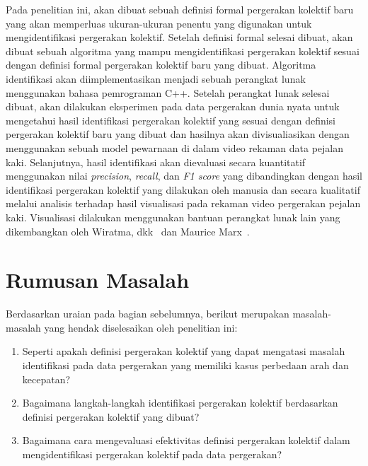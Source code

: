 Pada penelitian ini, akan dibuat sebuah definisi formal pergerakan kolektif baru yang akan memperluas ukuran-ukuran penentu yang digunakan untuk mengidentifikasi pergerakan kolektif. Setelah definisi formal selesai dibuat, akan dibuat sebuah algoritma yang mampu mengidentifikasi pergerakan kolektif sesuai dengan definisi formal pergerakan kolektif baru yang dibuat. Algoritma identifikasi akan diimplementasikan menjadi sebuah perangkat lunak menggunakan bahasa pemrograman C++. Setelah perangkat lunak selesai dibuat, akan dilakukan eksperimen pada data pergerakan dunia nyata untuk mengetahui hasil identifikasi pergerakan kolektif yang sesuai dengan definisi pergerakan kolektif baru yang dibuat dan hasilnya akan divisualiasikan dengan menggunakan sebuah model pewarnaan di dalam video rekaman data pejalan kaki. Selanjutnya, hasil identifikasi akan dievaluasi secara kuantitatif menggunakan nilai \textit{precision}, \textit{recall}, dan \textit{F1 score} yang dibandingkan dengan hasil identifikasi pergerakan kolektif yang dilakukan oleh manusia dan secara kualitatif melalui analisis terhadap hasil visualisasi pada rekaman video pergerakan pejalan kaki. Visualisasi dilakukan menggunakan bantuan perangkat lunak lain yang dikembangkan oleh Wiratma, dkk~\cite{wiratma:software} dan Maurice Marx~\cite{marx:software}.

\section{Rumusan Masalah}
\label{sec:rumusan}

Berdasarkan uraian pada bagian sebelumnya, berikut merupakan masalah-masalah yang hendak diselesaikan oleh penelitian ini:
\iffalse

\lionov{masalah pertama itu ukuran apa saja yang bisa digunakan, kedua bagaimana membuat model pergerakan kolektif yang memanfaatkan ukuran lintasan, yang ketiga bagaimana membuat algoritmanya. Soalnya yang poin 2 dan 3 kan gak dilakukan, elu gak ngebahas berbagai definisi formal, ukuran, teknik, dan algoritma (karena pertanyaannya ``apa aja''}

\fi
\begin{enumerate}
    \item Seperti apakah definisi pergerakan kolektif yang dapat mengatasi masalah identifikasi pada data pergerakan yang memiliki kasus perbedaan arah dan kecepatan? 
    \item Bagaimana langkah-langkah identifikasi pergerakan kolektif berdasarkan definisi pergerakan kolektif yang dibuat?  
    \item Bagaimana cara mengevaluasi efektivitas definisi pergerakan kolektif dalam mengidentifikasi pergerakan kolektif pada data pergerakan?
\end{enumerate}

